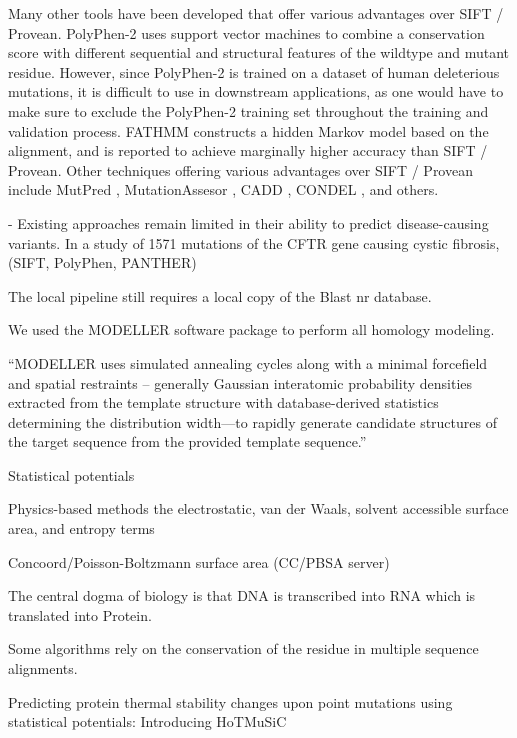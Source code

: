 Many other tools have been developed that offer various advantages over SIFT / Provean. PolyPhen-2 \cite{adzhubei_predicting_2001} uses support vector machines to combine a conservation score with different sequential and structural features of the wildtype and mutant residue. However, since PolyPhen-2 is trained on a dataset of human deleterious mutations, it is difficult to use in downstream applications, as one would have to make sure to exclude the PolyPhen-2 training set throughout the training and validation process. FATHMM \cite{shihab_ranking_2014} constructs a hidden Markov model based on the alignment, and is reported to achieve marginally higher accuracy than SIFT / Provean. Other techniques offering various advantages over SIFT / Provean include MutPred \cite{li_automated_2009}, MutationAssesor \cite{network_integrated_2011}, CADD \cite{kircher_general_2014}, CONDEL \cite{gonzalez-perez_improving_2011}, and others.



- Existing approaches remain limited in their ability to predict disease-causing variants. In a study of 1571 mutations of the CFTR gene causing cystic fibrosis, (SIFT, PolyPhen, PANTHER)

The local pipeline still requires a local copy of the Blast nr database.

We used the MODELLER software package to perform all homology modeling.

``MODELLER uses simulated annealing cycles along with a minimal forcefield and spatial restraints -- generally Gaussian interatomic probability densities extracted from the template structure with database-derived statistics determining the distribution width—to rapidly generate candidate structures of the target sequence from the provided template sequence.''


Statistical potentials

Physics-based methods
the electrostatic, van der Waals, solvent accessible surface area, and entropy terms

Concoord/Poisson-Boltzmann surface area (CC/PBSA server)

The central dogma of biology is that DNA is transcribed into RNA which is translated into Protein.


Some algorithms rely on the conservation of the residue in multiple sequence alignments.

Predicting protein thermal stability changes upon point mutations using statistical potentials: Introducing HoTMuSiC


